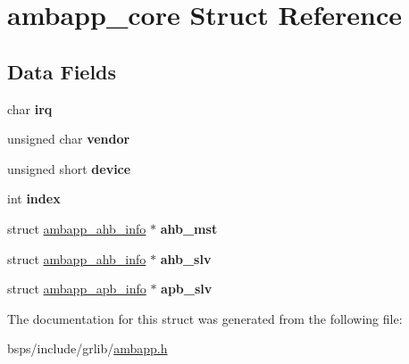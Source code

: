 \hypertarget{structambapp__core}{}\section{ambapp\+\_\+core Struct Reference}
\label{structambapp__core}
\subsection*{Data Fields}
\begin{DoxyCompactItemize}
\item 
\mbox{\label{structambapp__core_a6a9c107ab0d6f6db9989ba5aebf90082}} 
char {\bfseries irq}
\item 
\mbox{\label{structambapp__core_ae97c5d311d9642fcaac33ce8c405c7ee}} 
unsigned char {\bfseries vendor}
\item 
\mbox{\label{structambapp__core_aa5739a802e858ff040ca82f7e26b6174}} 
unsigned short {\bfseries device}
\item 
\mbox{\label{structambapp__core_a1a8eceb860a86c2c03cf2d38e864ee27}} 
int {\bfseries index}
\item 
\mbox{\label{structambapp__core_ae5252d7d2e84d024bdf753f9a298c971}} 
struct \mbox{\hyperlink{structambapp__ahb__info}{ambapp\+\_\+ahb\+\_\+info}} $\ast$ {\bfseries ahb\+\_\+mst}
\item 
\mbox{\label{structambapp__core_af01f7858eed92c3363131f5262ab3f35}} 
struct \mbox{\hyperlink{structambapp__ahb__info}{ambapp\+\_\+ahb\+\_\+info}} $\ast$ {\bfseries ahb\+\_\+slv}
\item 
\mbox{\label{structambapp__core_a4e0c1746da877d6276869a36efbc6035}} 
struct \mbox{\hyperlink{structambapp__apb__info}{ambapp\+\_\+apb\+\_\+info}} $\ast$ {\bfseries apb\+\_\+slv}
\end{DoxyCompactItemize}


The documentation for this struct was generated from the following file\+:\begin{DoxyCompactItemize}
\item 
bsps/include/grlib/\mbox{\hyperlink{ambapp_8h}{ambapp.\+h}}\end{DoxyCompactItemize}
